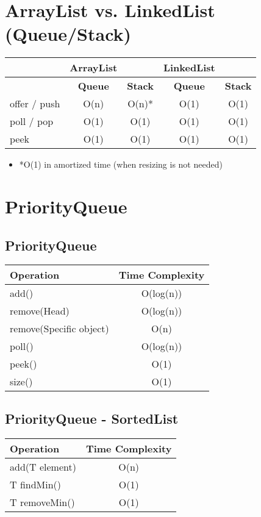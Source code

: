 \documentclass{article}
\begin{document}
\section{ArrayList vs. LinkedList (Queue/Stack)}
\begin{table}[h!]
\centering
\begin{tabular}{|l|c|c|c|c|}
\hline
& \textbf{ArrayList} & & \textbf{LinkedList} & \\
\hline
& \textbf{Queue} & \textbf{Stack} & \textbf{Queue} & \textbf{Stack} \\
\hline
offer / push & O(n) & O(n)* & O(1) & O(1) \\
\hline
poll / pop & O(1) & O(1) & O(1) & O(1) \\
\hline
peek & O(1) & O(1) & O(1) & O(1) \\
\hline
\end{tabular}
\end{table}
\begin{itemize}
  \item *O(1) in amortized time (when resizing is not needed)
\end{itemize}

\section{PriorityQueue}

\subsection{PriorityQueue}
\begin{table}[h!]
  \centering
  \begin{tabular}{|l|c|}
  \hline
  \textbf{Operation} & \textbf{Time Complexity} \\
  \hline
  add() & O(log(n))\\
  \hline
  remove(Head) & O(log(n))\\
  \hline
  remove(Specific object) & O(n)\\
  \hline
  poll() & O(log(n))\\
  \hline  
  peek() & O(1)\\
  \hline  
  size() & O(1)\\
  \hline  
  \end{tabular}
  \end{table}

\subsection{PriorityQueue - SortedList}
\begin{table}[h!]
\centering
\begin{tabular}{|l|c|}
\hline
\textbf{Operation} & \textbf{Time Complexity} \\
\hline
add(T element) & O(n) \\
\hline
T findMin() & O(1) \\
\hline
T removeMin() & O(1) \\
\hline
\end{tabular}
\end{table}
\end{document}
